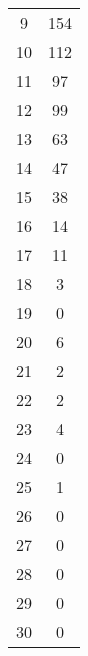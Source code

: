 \begin{tabular}{S[table-format=2.0] S[table-format=3.0]}
          9 & 154 \\
         10 & 112 \\
         11 &  97 \\
         12 &  99 \\
         13 &  63 \\
         14 &  47 \\
         15 &  38 \\
         16 &  14 \\
         17 &  11 \\
         18 &   3 \\
         19 &   0 \\
         20 &   6 \\
         21 &   2 \\
         22 &   2 \\
         23 &   4 \\
         24 &   0 \\
         25 &   1 \\
         26 &   0 \\
         27 &   0 \\
         28 &   0 \\
         29 &   0 \\
         30 &   0 \\
        \bottomrule
    \end{tabular}
